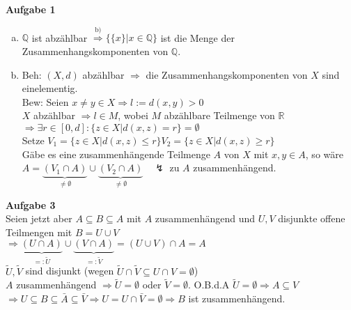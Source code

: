 \documentclass{article}
\begin{document}
\textbf{Aufgabe 1}
\begin{enumerate}[a)]
\item $\mathbb{Q}$ ist abzählbar $\stackrel{\text{b)}}{\Rightarrow} \big\{\{x\}|x\in\mathbb{Q}\big\}$ ist die Menge der Zusammenhangskomponenten von $\mathbb{Q}$.
\item Beh: $(X,d)$ abzählbar $\Rightarrow$ die Zusammenhangskomponenten von $X$ sind einelementig.\\
Bew: Seien $x\neq y\in X\Rightarrow l:=d(x,y)>0$\\
$X$ abzählbar $\Rightarrow l\in M$, wobei $M$ abzählbare Teilmenge von $\mathbb{R}$\\
$\Rightarrow\exists r\in[0,d]:\{z\in X|d(x,z) = r\} = \emptyset$\\
Setze $V_1 = \{z\in X|d(x,z) \leq r\} V_2 = \{z\in X|d(x,z) \geq r\}$\\
Gäbe es eine zusammenhängende Teilmenge $A$ von $X$ mit $x,y\in A$, so wäre $A=\underbrace{(V_1\cap A)}_{\neq\emptyset}\cup\underbrace{(V_2\cap A)}_{\neq\emptyset}\quad\lightning$ zu $A$ zusammenhängend.
\end{enumerate}

\textbf{Aufgabe 3}\\
Seien jetzt aber $A\subseteq B\subseteq A$ mit $A$ zusammenhängend und $U,V$ disjunkte offene Teilmengen mit $B=U\cup V$\\
$\Rightarrow\underbrace{(U\cap A)}_{=:\tilde U}\cup\underbrace{(V\cap A)}_{=:\tilde{V}} = (U\cup V)\cap A = A$\\
$\tilde{U},\tilde{V}$ sind disjunkt (wegen $\tilde{U}\cap\tilde{V}\subseteq U\cap V = \emptyset$)\\
$A$ zusammenhängend $\Rightarrow \tilde{U}=\emptyset$ oder $\tilde{V}=\emptyset$. O.B.d.A $\tilde{U}=\emptyset\Rightarrow A\subseteq V$\\
$\Rightarrow U\subseteq B\subseteq \bar{A}\subseteq\bar{V}\Rightarrow U=U\cap\bar{V} = \emptyset\Rightarrow B$ ist zusammenhängend.
\end{document}
